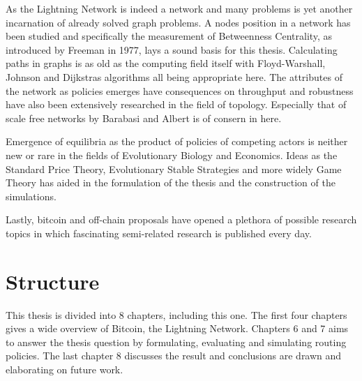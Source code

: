 	As the Lightning Network is indeed a network and many problems is yet another incarnation of already solved graph problems. A nodes position in a network has been studied and specifically the measurement of Betweenness Centrality, as introduced by Freeman in 1977\cite{brandes:betweenness:centrality:algorithm}, lays a sound basis for this thesis. Calculating paths in graphs is as old as the computing field itself with Floyd-Warshall, Johnson\cite{johnson:shortest:path:sparse:network} and Dijkstras algorithms all being appropriate here. The attributes of the network as policies emerges have consequences on throughput and robustness have also been extensively researched in the field of topology. Especially that of scale free networks by Barabasi and Albert\cite{barabasi:albert:emergent:scaling} is of consern in here.
	
	Emergence of equilibria as the product of policies of competing actors is neither new or rare in the fields of Evolutionary Biology and Economics. Ideas as the Standard Price Theory, Evolutionary Stable Strategies and more widely Game Theory has aided in the formulation of the thesis and the construction of the simulations.
	
	Lastly, bitcoin and off-chain proposals have opened a plethora of possible research topics in which fascinating semi-related research is published every day.  
	
	
\section{Structure}

This thesis is divided into 8 chapters, including this one. The first four chapters gives a wide overview of Bitcoin, the Lightning Network. Chapters 6 and 7 aims to answer the thesis question by formulating, evaluating and simulating routing policies. The last chapter 8 discusses the result and conclusions are drawn and elaborating on future work.

